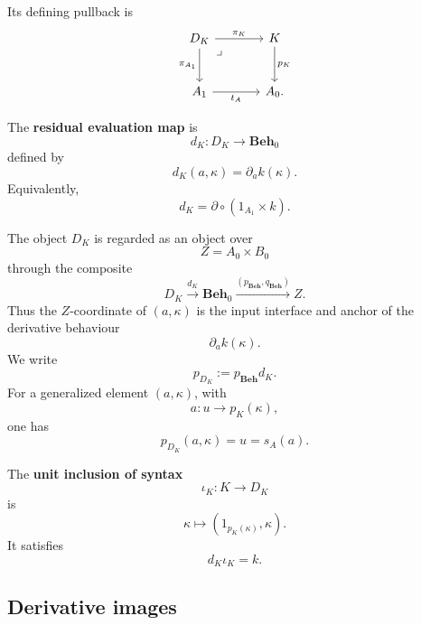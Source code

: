 Its defining pullback is
\[
    \begin{tikzcd}[column sep=large, row sep=large]
            D_K
                \arrow[r, "\pi_K"]
                \arrow[d, "\pi_{A_1}"']
                \arrow[dr, phantom, "\lrcorner", very near start]
        &
            K
                \arrow[d, "p_K"]
        \\
            A_1
                \arrow[r, "t_A"']
        &
            A_0.
    \end{tikzcd}
\]

\begin{definition}
\label{def:residual-evaluation}
    The \textbf{residual evaluation map} is
    \[
        d_K:D_K\to\mathbf{Beh}_0
    \]
    defined by
    \[
        d_K(a,\kappa)=\partial_a k(\kappa).
    \]
    Equivalently,
    \[
        d_K=
        \partial\circ(1_{A_1}\times k).
    \]
\end{definition}

The object \(D_K\) is regarded as an object over
\[
    Z=A_0\times B_0
\]
through the composite
\[
    D_K
        \xrightarrow{d_K}
    \mathbf{Beh}_0
        \xrightarrow{(p_{\mathbf{Beh}},q_{\mathbf{Beh}})}
    Z.
\]
Thus the \(Z\)-coordinate of \((a,\kappa)\) is the input interface and anchor of the derivative behaviour
\[
    \partial_a k(\kappa).
\]
We write
\[
    p_{D_K}:=p_{\mathbf{Beh}}d_K.
\]
For a generalized element \((a,\kappa)\), with
\[
    a:u\to p_K(\kappa),
\]
one has
\[
    p_{D_K}(a,\kappa)=u=s_A(a).
\]

\begin{definition}
\label{def:syntax-unit-inclusion}
    The \textbf{unit inclusion of syntax}
    \[
        \iota_K:K\to D_K
    \]
    is
    \[
        \kappa\longmapsto(1_{p_K(\kappa)},\kappa).
    \]
    It satisfies
    \[
        d_K\iota_K=k.
    \]
\end{definition}

\subsection{Derivative images}
\label{subsec:derivative-image}

